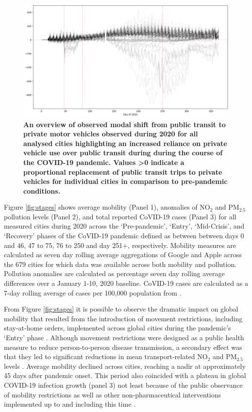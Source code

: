 \documentclass[preprint,12pt]{elsarticle}
\begin{document}
\begin{figure}
\centering
\includegraphics[trim={0 0 0 0},clip,scale=0.4]{Images/DrivingvsTransit.png}
\caption{\bf An overview of observed modal shift from public transit to private motor vehicles observed during 2020 for all analysed cities highlighting an increased reliance on private vehicle use over public transit during during the course of the COVID-19 pandemic. Values \textgreater 0 indicate a proportional replacement of public transit trips to private vehicles for individual cities in comparison to pre-pandemic conditions.}  
 \label{fig:driv_trans}
\end{figure}


Figure \ref{fig:stages} shows average mobility (Panel 1), anomalies of NO$_{2}$ and PM$_{2.5}$ pollution levels (Panel 2), and total reported CoVID-19 cases (Panel 3) for all measured cities during 2020 across the `Pre-pandemic', `Entry', `Mid-Crisis', and `Recovery' phases of the CoVID-19 pandemic defined as between between days 0 and 46, 47 to 75, 76 to 250 and day 251+, respectively. Mobility measures are calculated as seven day rolling average aggregations of Google and Apple across the 679 cities for which data was available across both mobility and pollution. Pollution anomalies are calculated as percentage seven day rolling average differences over a January 1-10, 2020 baseline. CoVID-19 cases are calculated as a 7-day rolling average of cases per 100,000 population from \cite{Google2022}.

From Figure \ref{fig:stages} it is possible to observe the dramatic impact on global mobility that resulted from the introduction of movement restrictions, including stay-at-home orders, implemented across global cities during the pandemic's `Entry' phase \cite{hale2021global}. Although movement restrictions were designed as a public health measure to reduce person-to-person disease transmission, a secondary effect was that they led to significant reductions in mean transport-related NO$_{2}$ and PM$_{2.5}$ levels \cite{zhang2023impact}. Average mobility declined across cities, reaching a nadir at approximately 45 days after pandemic onset. This period also coincided with a plateau in global COVID-19 infection growth (panel 3) not least because of the public observance of mobility restrictions as well as other non-pharmaceutical interventions implemented up to and including this time \cite{hale2021global}. 
\end{document}
